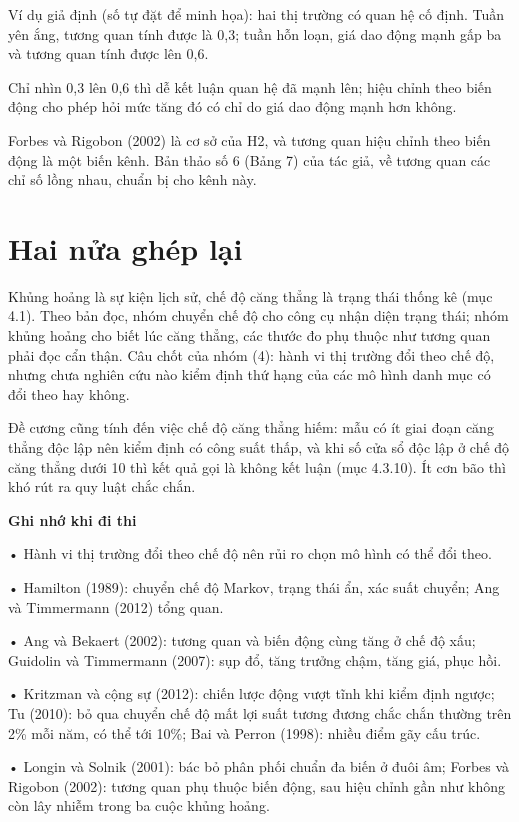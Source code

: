 \begin{tcolorbox}[breakable]
Ví dụ giả định (số tự đặt để minh họa): hai thị trường có quan hệ cố định. Tuần yên ắng, tương quan tính được là 0,3; tuần hỗn loạn, giá dao động mạnh gấp ba và tương quan tính được lên 0,6.

Chỉ nhìn 0,3 lên 0,6 thì dễ kết luận quan hệ đã mạnh lên; hiệu chỉnh theo biến động cho phép hỏi mức tăng đó có chỉ do giá dao động mạnh hơn không.
\end{tcolorbox}

Forbes và Rigobon (2002) là cơ sở của H2, và tương quan hiệu chỉnh theo biến động là một biến kênh. Bản thảo số 6 (Bảng 7) của tác giả, về tương quan các chỉ số lồng nhau, chuẩn bị cho kênh này.

\section{Hai nửa ghép lại}

Khủng hoảng là sự kiện lịch sử, chế độ căng thẳng là trạng thái thống kê (mục 4.1). Theo bản đọc, nhóm chuyển chế độ cho công cụ nhận diện trạng thái; nhóm khủng hoảng cho biết lúc căng thẳng, các thước đo phụ thuộc như tương quan phải đọc cẩn thận. Câu chốt của nhóm (4): hành vi thị trường đổi theo chế độ, nhưng chưa nghiên cứu nào kiểm định thứ hạng của các mô hình danh mục có đổi theo hay không.

Đề cương cũng tính đến việc chế độ căng thẳng hiếm: mẫu có ít giai đoạn căng thẳng độc lập nên kiểm định có công suất thấp, và khi số cửa sổ độc lập ở chế độ căng thẳng dưới 10 thì kết quả gọi là không kết luận (mục 4.3.10). Ít cơn bão thì khó rút ra quy luật chắc chắn.

\begin{tcolorbox}[breakable]
\textbf{Ghi nhớ khi đi thi}

• Hành vi thị trường đổi theo chế độ nên rủi ro chọn mô hình có thể đổi theo.

• Hamilton (1989): chuyển chế độ Markov, trạng thái ẩn, xác suất chuyển; Ang và Timmermann (2012) tổng quan.

• Ang và Bekaert (2002): tương quan và biến động cùng tăng ở chế độ xấu; Guidolin và Timmermann (2007): sụp đổ, tăng trưởng chậm, tăng giá, phục hồi.

• Kritzman và cộng sự (2012): chiến lược động vượt tĩnh khi kiểm định ngược; Tu (2010): bỏ qua chuyển chế độ mất lợi suất tương đương chắc chắn thường trên 2\% mỗi năm, có thể tới 10\%; Bai và Perron (1998): nhiều điểm gãy cấu trúc.

• Longin và Solnik (2001): bác bỏ phân phối chuẩn đa biến ở đuôi âm; Forbes và Rigobon (2002): tương quan phụ thuộc biến động, sau hiệu chỉnh gần như không còn lây nhiễm trong ba cuộc khủng hoảng.
\end{tcolorbox}


